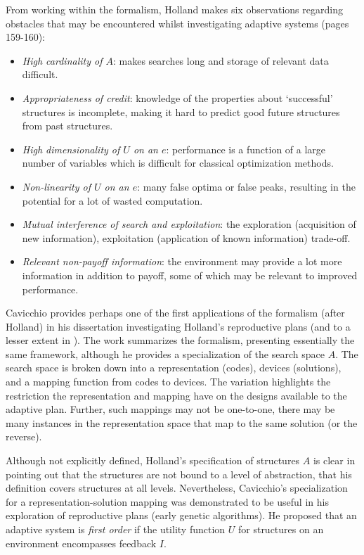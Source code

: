 \documentclass[a4paper, 11pt]{article}
\begin{document}
From working within the formalism, Holland makes six observations regarding obstacles that may be encountered whilst investigating adaptive systems \cite{Holland1975} (pages 159-160): 

\begin{itemize}
	\item \emph{High cardinality of $A$}: makes searches long and storage of relevant data difficult.
	\item \emph{Appropriateness of credit}: knowledge of the properties about `successful' structures is incomplete, making it hard to predict good future structures from past structures.
	\item \emph{High dimensionality of $U$ on an $e$}: performance is a function of a large number of variables which is difficult for classical optimization methods.
	\item \emph{Non-linearity of $U$ on an $e$}: many false optima or false peaks, resulting in the potential for a lot of wasted computation.
	\item \emph{Mutual interference of search and exploitation}: the exploration (acquisition of new information), exploitation (application of known information) trade-off.
	\item \emph{Relevant non-payoff information}: the environment may provide a lot more information in addition to payoff, some of which may be relevant to improved performance.
\end{itemize}

Cavicchio provides perhaps one of the first applications of the formalism (after Holland) in his dissertation investigating Holland's reproductive plans \cite{Cavicchio1970} (and to a lesser extent in \cite{Daniel1972}). The work summarizes the formalism, presenting essentially the same framework, although he provides a specialization of the search space $A$. The search space is broken down into a representation (codes), devices (solutions), and a mapping function from codes to devices. The variation highlights the restriction the representation and mapping have on the designs available to the adaptive plan. Further, such mappings may not be one-to-one, there may be many instances in the representation space that map to the same solution (or the reverse). 

Although not explicitly defined, Holland's specification of structures $A$ is clear in pointing out that the structures are not bound to a level of abstraction, that his definition covers structures at all levels. Nevertheless, Cavicchio's specialization for a representation-solution mapping was demonstrated to be useful in his exploration of reproductive plans (early genetic algorithms). He proposed that an adaptive system is \emph{first order} if the utility function $U$ for structures on an environment encompasses feedback $I$.
\end{document}
